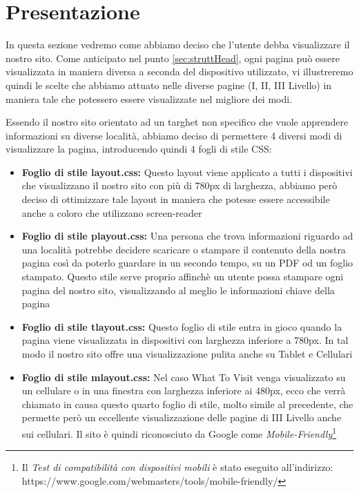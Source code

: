 \section{Presentazione}\label{sec:presentazione}
In questa sezione vedremo come abbiamo deciso che l'utente debba visualizzare il nostro sito.
Come anticipato nel punto \ref{sec:struttHead}, ogni pagina può essere visualizzata in maniera diversa a seconda del dispositivo utilizzato, vi illustreremo quindi le scelte che abbiamo attuato nelle diverse pagine (I, II, III Livello) in maniera tale che potessero essere visualizzate nel migliore dei modi.

Essendo il nostro sito orientato ad un targhet non specifico che vuole apprendere informazioni su diverse località, abbiamo deciso di permettere 4 diversi modi di visualizzare la pagina, introducendo quindi 4 fogli di stile CSS:
\begin{itemize}
\item \textbf{Foglio di stile layout.css:} Questo layout viene applicato a tutti i dispositivi che visualizzano il nostro sito con più di 780px di larghezza, abbiamo però deciso di ottimizzare tale layout in maniera che potesse essere accessibile anche a coloro che utilizzano screen-reader
\item \textbf{Foglio di stile playout.css:} Una persona che trova informazioni riguardo ad una località potrebbe decidere scaricare o stampare il contenuto della nostra pagina così da poterlo guardare in un secondo tempo, su un PDF od un foglio stampato. Questo stile serve proprio affinchè un utente possa stampare ogni pagina del nostro sito, visualizzando al meglio le informazioni chiave della pagina
\item \textbf{Foglio di stile tlayout.css:} Questo foglio di stile entra in gioco quando la pagina viene visualizzata in dispositivi con larghezza inferiore a 780px. In tal modo il nostro sito offre una visualizzazione pulita anche su Tablet e Cellulari
\item \textbf{Foglio di stile mlayout.css:} Nel caso What To Visit venga visualizzato su un cellulare o in una finestra con larghezza inferiore ai 480px, ecco che verrà chiamato in causa questo quarto foglio di stile, molto simile al precedente, che permette però un eccellente visualizzazione delle pagine di III Livello anche sui cellulari. Il sito è quindi riconosciuto da Google come \textit{Mobile-Friendly}\footnote{Il \textit{Test di compatibilità con dispositivi mobili} è stato eseguito all'indirizzo: https://www.google.com/webmasters/tools/mobile-friendly/}
\end{itemize}


